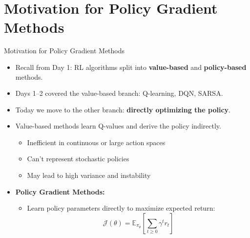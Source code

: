 \section{Motivation for Policy Gradient Methods}
\begin{frame}{Motivation for Policy Gradient Methods}
    \begin{itemize}
        \item Recall from Day 1: RL algorithms split into \textbf{value-based} and \textbf{policy-based} methods.
        \item Days 1--2 covered the value-based branch: Q-learning, DQN, SARSA.
        \item Today we move to the other branch: \textbf{directly optimizing the policy}.
        \pause
        \item Value-based methods learn Q-values and derive the policy indirectly.
        \begin{itemize}
            \item Inefficient in continuous or large action spaces
            \item Can’t represent stochastic policies
            \item May lead to high variance and instability
        \end{itemize}
        \vspace{1em}
        \item[]\textbf{Policy Gradient Methods:}
        \begin{itemize}
            \item Learn policy parameters directly to maximize expected return:
            \[
                \mathcal{J}(\theta) = \mathbb{E}_{\pi_\theta}\!\left[\sum_{t \geq 0} \gamma^t r_t\right]
            \]
        \end{itemize}
    \end{itemize}
\end{frame}